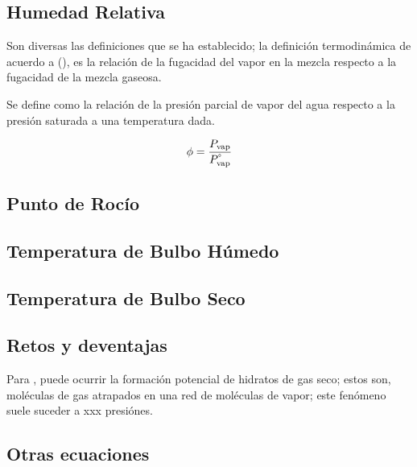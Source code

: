 \subsection{Humedad Relativa}
Son diversas las definiciones que se ha establecido; la definición termodinámica de acuerdo a (), es la relación de la fugacidad del vapor en la mezcla respecto a la fugacidad de la mezcla gaseosa.

Se define como la relación de la presión parcial de vapor del agua respecto a la presión saturada a una temperatura dada.

\begin{equation}
  \eqRelativeHumidityFst{\RelativeHumidity}
\end{equation}

\subsection{Punto de Rocío}
\subsection{Temperatura de Bulbo Húmedo}
\subsection{Temperatura de Bulbo Seco}



\subsection{Retos y deventajas}
Para \parencite[p. 8]{Bell2017}, puede ocurrir la formación potencial de hidratos de gas seco; estos son, moléculas de gas atrapados en una red de moléculas de vapor; este fenómeno suele suceder a xxx presiónes.
\subsection{Otras ecuaciones}


